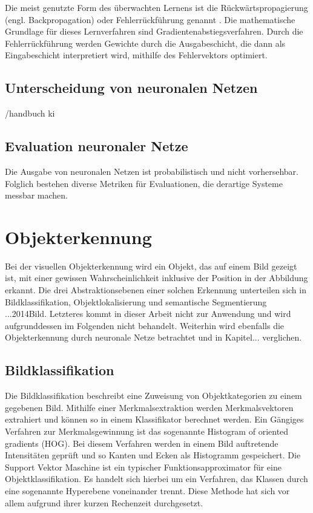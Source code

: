 		Die meist genutzte Form des überwachten Lernens ist die Rückwärtspropagierung (engl. Backpropagation) oder Fehlerrückführung genannt \cite{Ertel}. Die mathematische Grundlage für dieses Lernverfahren sind Gradientenabstiegsverfahren. Durch die Fehlerrückführung werden Gewichte durch die Ausgabeschicht, die dann als Eingabeschicht interpretiert wird, mithilfe des Fehlervektors optimiert.\cite{Kriesel}
		
		\subsection{Unterscheidung von neuronalen Netzen}
		/handbuch ki
		
	
		
		\subsection{Evaluation neuronaler Netze}
			
		Die Ausgabe von neuronalen Netzen ist probabilistisch und nicht vorhersehbar. Folglich bestehen diverse Metriken für Evaluationen, die derartige Systeme messbar machen. 
		
	\section{Objekterkennung}
	\label{sec: Mecanumräder}
	Bei der visuellen Objekterkennung wird ein Objekt, das auf einem Bild gezeigt ist, mit einer gewissen Wahrscheinlichkeit inklusive der Position in der Abbildung erkannt. Die drei Abstraktionsebenen einer solchen Erkennung unterteilen sich in Bildklassifikation, Objektlokalisierung und semantische Segmentierung ...2014Bild. Letzteres kommt in dieser Arbeit nicht zur Anwendung und wird aufgrunddessen im Folgenden nicht behandelt. Weiterhin wird ebenfalls die Objekterkennung durch neuronale Netze betrachtet und in Kapitel... verglichen.
	
		\subsection{Bildklassifikation}
		Die Bildklassifikation beschreibt eine Zuweisung von Objektkategorien zu einem gegebenen Bild. Mithilfe einer Merkmalsextraktion werden Merkmalsvektoren extrahiert und können so in einem Klassifikator berechnet werden. Ein Gängiges Verfahren zur Merkmalsgewinnung ist das sogenannte Histogram of oriented gradients (HOG). Bei diesem Verfahren werden in einem Bild auftretende Intensitäten geprüft und so Kanten und Ecken als Histogramm gespeichert. Die Support Vektor Maschine ist ein typischer Funktionsapproximator für eine Objektklassifikation. Es handelt sich hierbei um ein Verfahren, das Klassen durch eine sogenannte Hyperebene voneinander trennt. Diese Methode hat sich vor allem aufgrund ihrer kurzen Rechenzeit durchgesetzt.
			
